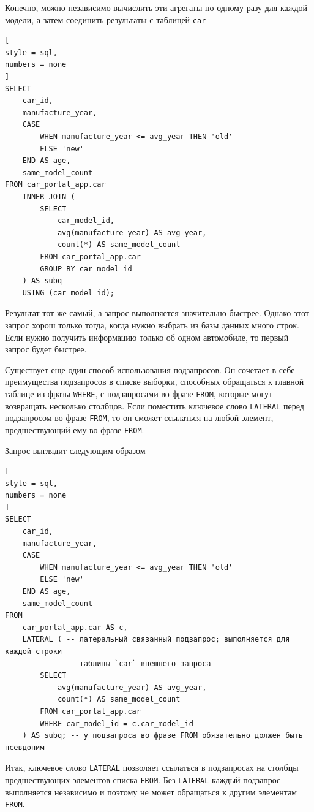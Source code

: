 \documentclass[%
	11pt,
	a4paper,
	utf8,
		]{article}
\begin{document}
Конечно, можно независимо вычислить эти агрегаты по одному разу для каждой модели, а затем соединить результаты с таблицей \texttt{car}
\begin{lstlisting}[
style = sql,
numbers = none
]
SELECT
    car_id,
    manufacture_year,
    CASE
        WHEN manufacture_year <= avg_year THEN 'old'
        ELSE 'new'
    END AS age,
    same_model_count
FROM car_portal_app.car
    INNER JOIN (
        SELECT
            car_model_id,
            avg(manufacture_year) AS avg_year,
            count(*) AS same_model_count
        FROM car_portal_app.car
        GROUP BY car_model_id
    ) AS subq
    USING (car_model_id);
\end{lstlisting}

Результат тот же самый, а запрос выполняется значительно быстрее. Однако этот запрос хорош только тогда, когда нужно выбрать из базы данных много строк. Если нужно получить информацию только об одном автомобиле, то первый запрос будет быстрее.

Существует еще один способ использования подзапросов. Он сочетает в себе преимущества подзапросов в списке выборки, способных обращаться к главной таблице из фразы \texttt{WHERE}, с подзапросами во фразе \texttt{FROM}, которые могут возвращать несколько столбцов. Если поместить ключевое слово \texttt{LATERAL} перед подзапросом во фразе \texttt{FROM}, то он сможет ссылаться на любой элемент, предшествующий ему во фразе \texttt{FROM}.

Запрос выглядит следующим образом
\begin{lstlisting}[
style = sql,
numbers = none
]
SELECT
    car_id,
    manufacture_year,
    CASE
        WHEN manufacture_year <= avg_year THEN 'old'
        ELSE 'new'
    END AS age,
    same_model_count
FROM
    car_portal_app.car AS c,
    LATERAL ( -- латеральный связанный подзапрос; выполняется для каждой строки
              -- таблицы `car` внешнего запроса
        SELECT
            avg(manufacture_year) AS avg_year,
            count(*) AS same_model_count
        FROM car_portal_app.car
        WHERE car_model_id = c.car_model_id
    ) AS subq; -- у подзапроса во фразе FROM обязательно должен быть псевдоним
\end{lstlisting}

Итак, ключевое слово \texttt{LATERAL} позволяет ссылаться в подзапросах на столбцы предшествующих элементов списка \texttt{FROM}. Без \texttt{LATERAL} каждый подзапрос выполняется независимо и поэтому не может обращаться к другим элементам \texttt{FROM}.
\end{document}
